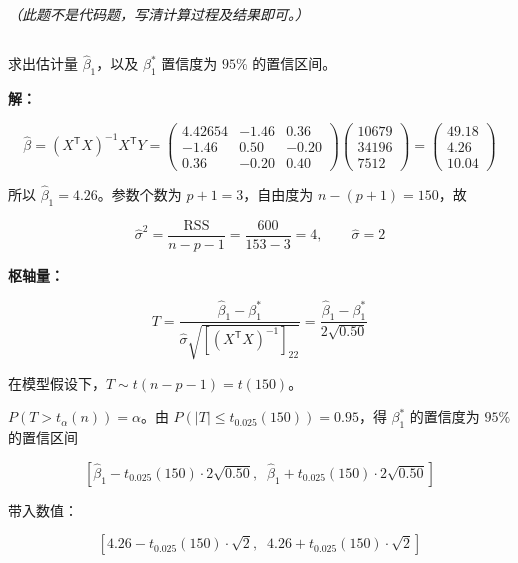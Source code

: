 \documentclass[12pt,a4paper]{article}
\begin{document}
\textit{（此题不是代码题，写清计算过程及结果即可。）}

\subsection{}

求出估计量 $\hat{\beta}_1$，以及 $\beta_1^*$ 置信度为 $95\%$
    的置信区间。

\begin{answerbox}
\textbf{解：}

$$
\hat{\beta}=(X^\mathsf{T}X)^{-1}X^\mathsf{T}Y=\begin{pmatrix}4.42654 & -1.46 & 0.36\\ -1.46 & 0.50 & -0.20\\ 0.36 & -0.20 & 0.40\end{pmatrix}\begin{pmatrix}10679\\34196\\7512\end{pmatrix}=\begin{pmatrix}49.18\\4.26\\10.04\end{pmatrix}
$$

所以 $\hat{\beta}_1=4.26$。参数个数为 $p+1=3$，自由度为 $n-(p+1)=150$，故

$$
\hat{\sigma}^2=\frac{\mathrm{RSS}}{n-p-1}=\frac{600}{153-3}=4,\qquad \hat{\sigma}=2
$$

\textbf{枢轴量：}

$$
T=\frac{\hat{\beta}_1-\beta_1^*}{\hat{\sigma}\sqrt{\left[(X^\mathsf{T}X)^{-1}\right]_{22}}}=\frac{\hat{\beta}_1-\beta_1^*}{2\sqrt{0.50}}
$$

在模型假设下，$T\sim t(n-p-1)=t(150)$。

$P\left(T>t_\alpha(n)\right)=\alpha$。由 $P\left(|T|\le t_{0.025}(150)\right)=0.95$，得 $\beta_1^*$ 的置信度为 $95\%$ 的置信区间

$$
\left[\hat{\beta}_1-t_{0.025}(150)\cdot 2\sqrt{0.50},\;\;\hat{\beta}_1+t_{0.025}(150)\cdot 2\sqrt{0.50}\right]
$$

带入数值：

$$
\left[4.26-t_{0.025}(150)\cdot\sqrt{2},\;\;4.26+t_{0.025}(150)\cdot\sqrt{2}\right]
$$

\end{answerbox}

\subsection{}
\end{document}
